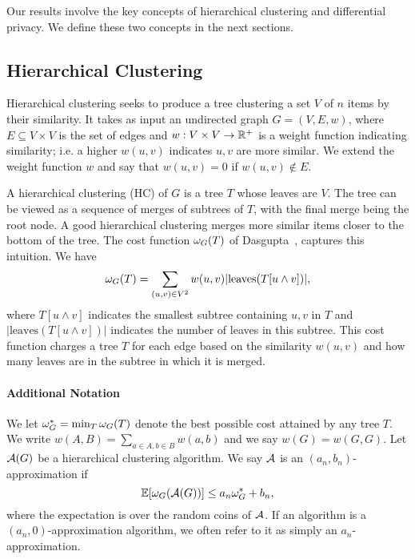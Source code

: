Our results involve the key concepts of hierarchical clustering and differential privacy. We define these two concepts in the next sections.

\subsection{Hierarchical Clustering}

Hierarchical clustering seeks to produce a tree clustering a set $V$ of $n$ items by their similarity. It takes as input an undirected graph $G = (V, E, w)$, where $E \subseteq V \times V$ is the set of edges and $w : V \times V \rightarrow \mathbb{R}^+$ is a weight function indicating similarity; i.e. a higher $w(u,v)$ indicates $u,v$ are more similar. We extend the weight function $w$ and say that $w(u,v) = 0$ if $w(u,v) \notin E$.

A hierarchical clustering (HC) of $G$ is a tree $T$ whose leaves are $V$. The tree can be viewed as a sequence of merges of subtrees of $T$, with the final merge being the root node. A good hierarchical clustering merges more similar items closer to the bottom of the tree. The cost function $\omega_G(T)$ of Dasgupta~\citep{dasgupta2016cost}, captures this intuition. We have
\begin{equation}\label{eq:hc-cost}
    \omega_G(T) = \sum_{(u,v) \in V^2} w(u,v) |\text{leaves}(T[u\wedge v])|,
\end{equation}
where $T[u \wedge v]$ indicates the smallest subtree containing $u,v$ in $T$ and $|\text{leaves}(T[u \wedge v])|$ indicates the number of leaves in this subtree. This cost function charges a tree $T$ for each edge based on the similarity $w(u,v)$ and how many leaves are in the subtree in which it is merged. 

\paragraph{Additional Notation}
We let $\omega_G^* = \min_T \omega_G(T)$ denote the best possible cost attained by any tree $T$. We write $w(A,B) = \sum_{a \in A, b \in B} w(a,b)$ and we say $w(G) = w(G,G)$. Let $\mathcal{A}(G)$ be a hierarchical clustering algorithm. We say $\mathcal{A}$ is an $(a_n, b_n)$-approximation if
\begin{equation}\label{eq:hc-obj}
    \operatorname{\mathbb{E}}[\omega_G(\mathcal{A}(G))] \leq a_n \omega_G^* + b_n,
\end{equation}
where the expectation is over the random coins of $\mathcal{A}$. If an algorithm is a $(a_n, 0)$-approximation algorithm, we often refer to it as simply an $a_n$-approximation.

